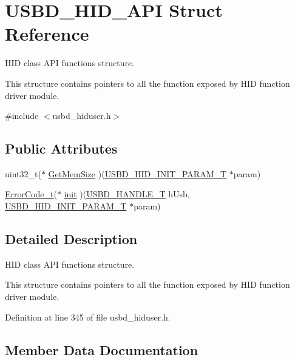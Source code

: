 \hypertarget{struct_u_s_b_d___h_i_d___a_p_i}{}\section{U\+S\+B\+D\+\_\+\+H\+I\+D\+\_\+\+A\+PI Struct Reference}
\label{struct_u_s_b_d___h_i_d___a_p_i}


H\+ID class A\+PI functions structure.

This structure contains pointers to all the function exposed by H\+ID function driver module.  




{\ttfamily \#include $<$usbd\+\_\+hiduser.\+h$>$}

\subsection*{Public Attributes}
\begin{DoxyCompactItemize}
\item 
uint32\+\_\+t($\ast$ \hyperlink{struct_u_s_b_d___h_i_d___a_p_i_a020839a4e29677899bb7a0a2c11b1252}{Get\+Mem\+Size} )(\hyperlink{group___u_s_b_d___h_i_d_ga192251fa5ec461eaa9a77b76dbe7c3fa}{U\+S\+B\+D\+\_\+\+H\+I\+D\+\_\+\+I\+N\+I\+T\+\_\+\+P\+A\+R\+A\+M\+\_\+T} $\ast$param)
\item 
\hyperlink{error_8h_a905255056c349318139d94aa4523d516}{Error\+Code\+\_\+t}($\ast$ \hyperlink{struct_u_s_b_d___h_i_d___a_p_i_a7b98c434713f1deb07abafcb52fae76d}{init} )(\hyperlink{group___u_s_b_d___core_gafdbb2204d929cb9d75736bd2b42342ac}{U\+S\+B\+D\+\_\+\+H\+A\+N\+D\+L\+E\+\_\+T} h\+Usb, \hyperlink{group___u_s_b_d___h_i_d_ga192251fa5ec461eaa9a77b76dbe7c3fa}{U\+S\+B\+D\+\_\+\+H\+I\+D\+\_\+\+I\+N\+I\+T\+\_\+\+P\+A\+R\+A\+M\+\_\+T} $\ast$param)
\end{DoxyCompactItemize}


\subsection{Detailed Description}
H\+ID class A\+PI functions structure.

This structure contains pointers to all the function exposed by H\+ID function driver module. 



Definition at line 345 of file usbd\+\_\+hiduser.\+h.



\subsection{Member Data Documentation}
\mbox{\label{struct_u_s_b_d___h_i_d___a_p_i_a020839a4e29677899bb7a0a2c11b1252}} 
